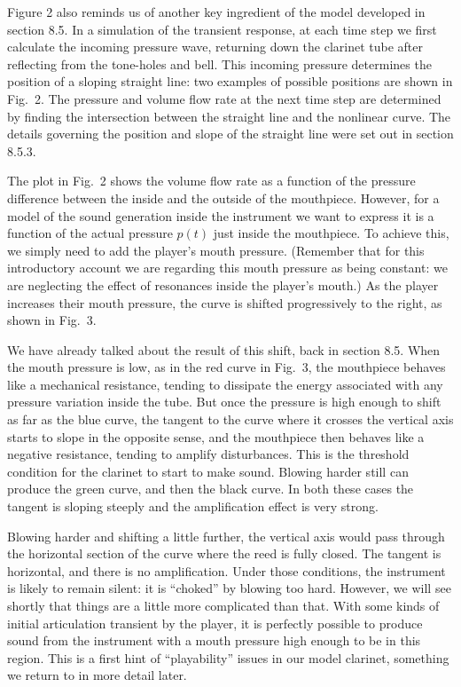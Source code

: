   Figure 2 also reminds us of another key ingredient of the model developed in 
  section 8.5. In a simulation of the transient response, at each time step we 
  first calculate the incoming pressure wave, returning down the clarinet tube 
  after reflecting from the tone-holes and bell. This incoming pressure 
  determines the position of a sloping straight line: two examples of possible 
  positions are shown in Fig.\ 2. The pressure and volume flow rate at the next 
  time step are determined by finding the intersection between the straight 
  line and the nonlinear curve. The details governing the position and slope of 
  the straight line were set out in section 8.5.3. 

  The plot in Fig.\ 2 shows the volume flow rate as a function of the pressure 
  difference between the inside and the outside of the mouthpiece. However, for 
  a model of the sound generation inside the instrument we want to express it 
  is a function of the actual pressure $p(t)$ just inside the mouthpiece. To 
  achieve this, we simply need to add the player’s mouth pressure. (Remember 
  that for this introductory account we are regarding this mouth pressure as 
  being constant: we are neglecting the effect of resonances inside the 
  player's mouth.) As the player increases their mouth pressure, the curve is 
  shifted progressively to the right, as shown in Fig.\ 3. 

  We have already talked about the result of this shift, back in section 8.5. 
  When the mouth pressure is low, as in the red curve in Fig.\ 3, the 
  mouthpiece behaves like a mechanical resistance, tending to dissipate the 
  energy associated with any pressure variation inside the tube. But once the 
  pressure is high enough to shift as far as the blue curve, the tangent to the 
  curve where it crosses the vertical axis starts to slope in the opposite 
  sense, and the mouthpiece then behaves like a negative resistance, tending to 
  amplify disturbances. This is the threshold condition for the clarinet to 
  start to make sound. Blowing harder still can produce the green curve, and 
  then the black curve. In both these cases the tangent is sloping steeply and 
  the amplification effect is very strong. 

  Blowing harder and shifting a little further, the vertical axis would pass 
  through the horizontal section of the curve where the reed is fully closed. 
  The tangent is horizontal, and there is no amplification. Under those 
  conditions, the instrument is likely to remain silent: it is ``choked'' by 
  blowing too hard. However, we will see shortly that things are a little more 
  complicated than that. With some kinds of initial articulation transient by 
  the player, it is perfectly possible to produce sound from the instrument 
  with a mouth pressure high enough to be in this region. This is a first hint 
  of ``playability'' issues in our model clarinet, something we return to in 
  more detail later. 

